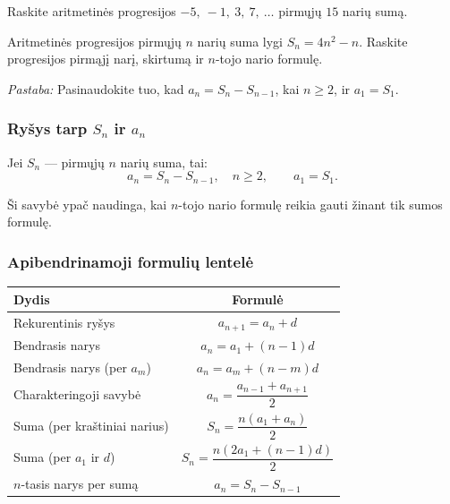 \begin{exercise}
Raskite aritmetinės progresijos $-5,\ -1,\ 3,\ 7,\ \ldots$ pirmųjų $15$ narių sumą.
\end{exercise}

\begin{exercise}
Aritmetinės progresijos pirmųjų $n$ narių suma lygi $S_n = 4n^2 - n$. Raskite progresijos pirmąjį narį, skirtumą ir $n$-tojo nario formulę.

\textit{Pastaba:} Pasinaudokite tuo, kad $a_n = S_n - S_{n-1}$, kai $n \geq 2$, ir $a_1 = S_1$.
\end{exercise}

\subsubsection*{Ryšys tarp $S_n$ ir $a_n$}

\begin{theorem}
Jei $S_n$ — pirmųjų $n$ narių suma, tai:
\[
a_n = S_n - S_{n-1}, \quad n \geq 2, \qquad a_1 = S_1.
\]
\end{theorem}

Ši savybė ypač naudinga, kai $n$-tojo nario formulę reikia gauti žinant tik sumos formulę.

\subsubsection*{Apibendrinamoji formulių lentelė}

\begin{center}
\begin{tabular}{|l|c|}
\hline
\textbf{Dydis} & \textbf{Formulė} \\
\hline
Rekurentinis ryšys & $a_{n+1} = a_n + d$ \\
\hline
Bendrasis narys & $a_n = a_1 + (n-1)d$ \\
\hline
Bendrasis narys (per $a_m$) & $a_n = a_m + (n-m)d$ \\
\hline
Charakteringoji savybė & $a_n = \dfrac{a_{n-1}+a_{n+1}}{2}$ \\
\hline
Suma (per kraštiniai narius) & $S_n = \dfrac{n(a_1+a_n)}{2}$ \\
\hline
Suma (per $a_1$ ir $d$) & $S_n = \dfrac{n(2a_1+(n-1)d)}{2}$ \\
\hline
$n$-tasis narys per sumą & $a_n = S_n - S_{n-1}$ \\
\hline
\end{tabular}
\end{center}

